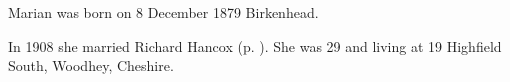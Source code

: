 
Marian was born on 8 December 1879 Birkenhead.

In 1908 she married Richard Hancox (p. \pageref{Richard_James_Hancox}). She was 29 and living at 19 Highfield South, Woodhey, Cheshire.
